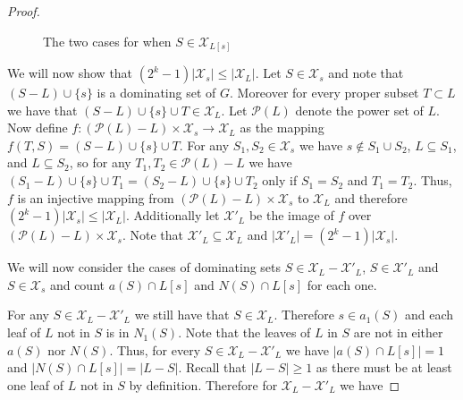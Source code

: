 \documentclass[11pt]{article}
\begin{document}
\begin{proof}
\begin{figure}[h]
{{}}
\caption{The two cases for when $S \in \mathcal{X}_{L[s]}$}%
\label{fig:L12}%
\end{figure}


We will now show that $(2^{k}-1)|\mathcal{X}_{s}| \leq |\mathcal{X}_{L}|$. Let $S \in \mathcal{X}_{s}$ and note that $(S-L) \cup \{s\}$ is a dominating set of $G$. Moreover for every proper subset $T \subset L$ we have that $(S-L) \cup \{s\} \cup T \in \mathcal{X}_{L}$. Let $\mathcal{P}(L)$ denote the power set of $L$. Now define $f: (\mathcal{P}(L)-L) \times \mathcal{X}_{s} \rightarrow \mathcal{X}_{L}$ as the mapping $f(T, S) = (S-L) \cup \{s\} \cup T$. For any $S_1, S_2 \in \mathcal{X}_{s}$ we have $s\not\in S_1\cup S_2$, $L\subseteq S_1$, and $L\subseteq S_2$, so for any $T_1, T_2 \in \mathcal{P}(L)-L$ we have $(S_1-L)\cup \{s\} \cup T_1=(S_2-L)\cup \{s\} \cup T_2$ only if $S_1=S_2$ and $T_1=T_2$. Thus, $f$ is an injective mapping from $(\mathcal{P}(L)-L) \times \mathcal{X}_{s}$ to $\mathcal{X}_{L}$ and therefore $(2^{k}-1)|\mathcal{X}_{s}| \leq |\mathcal{X}_{L}|$. Additionally let $\mathcal{X}'_{L}$ be the image of $f$ over $(\mathcal{P}(L)-L) \times \mathcal{X}_{s}$. Note that $\mathcal{X}'_{L} \subseteq \mathcal{X}_{L}$ and $|\mathcal{X}'_{L}|=(2^{k}-1)|\mathcal{X}_{s}|$.

We will now consider the cases of dominating sets $S \in \mathcal{X}_{L}- \mathcal{X}'_{L}$, $S \in \mathcal{X}'_{L}$ and $S \in \mathcal{X}_{s}$ and count $a(S) \cap L[s]$ and $N(S)\cap L[s]$ for each one.

For any $S \in \mathcal{X}_{L}- \mathcal{X}'_{L}$ we still have that $S \in \mathcal{X}_{L}$. Therefore $s \in a_1(S)$ and each leaf of $L$ not in $S$ is in $N_1(S)$. Note that the leaves of $L$ in $S$ are not in either $a(S)$ nor $N(S)$. Thus, for every $S \in \mathcal{X}_{L}- \mathcal{X}'_{L}$ we have $|a(S) \cap L[s]|=1$ and $|N(S) \cap L[s]|=|L-S|$. Recall that $|L-S|\geq 1$ as there must be at least one leaf of $L$ not in $S$ by definition. Therefore for $\mathcal{X}_{L}-\mathcal{X}'_{L}$ we have




\end{proof}
\end{document}
